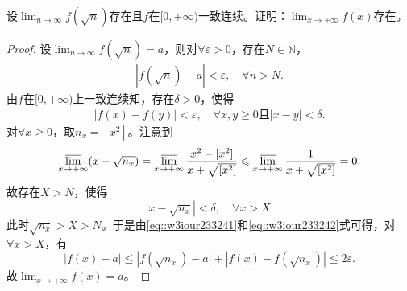 \documentclass[../../main.tex]{subfiles}%
\begin{document}
\begin{example}
设\( \lim_{n \to \infty} f(\sqrt{n}) \)存在且\( f \)在\( [0, +\infty) \)一致连续。证明：\( \lim_{x \to +\infty} f(x) \)存在。
\end{example}
\begin{proof}

设\( \lim_{n \to \infty} f(\sqrt{n}) = a \)，则对\( \forall \varepsilon > 0 \)，存在\( N \in \mathbb{N} \)，
\begin{align}
|f(\sqrt{n}) - a| < \varepsilon, \quad \forall n > N. \label{eq::w3iour233241}
\end{align}
由\( f \)在\( [0, +\infty) \)上一致连续知，存在\( \delta > 0 \)，使得
\begin{align}
|f(x) - f(y)| < \varepsilon, \quad \forall x, y \geqslant 0 \text{且} |x - y| < \delta. \label{eq::w3iour233242}
\end{align}
对\( \forall x \geqslant 0 \)，取\( n_x = [x^2] \)。注意到
\[
\varlimsup_{x \to +\infty} (x - \sqrt{n_x}) = \varlimsup_{x \to +\infty} \frac{x^2 - [x^2]}{x + \sqrt{[x^2]}} \leqslant \varlimsup_{x \to +\infty} \frac{1}{x + \sqrt{[x^2]}} = 0.
\]
故存在\( X > N \)，使得
\[
|x - \sqrt{n_x}| < \delta, \quad \forall x > X.
\]
此时\( \sqrt{n_x} > X > N \)。于是由\eqref{eq::w3iour233241}和\eqref{eq::w3iour233242}式可得，对\( \forall x > X \)，有
\[
|f(x) - a| \leqslant |f(\sqrt{n_x}) - a| + |f(x) - f(\sqrt{n_x})| \leqslant 2\varepsilon.
\]
故\( \lim_{x \to +\infty} f(x) = a \)。

\end{proof}
\end{document}
